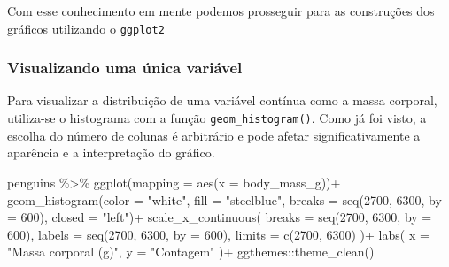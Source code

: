 \documentclass[
  12pt,
  letterpaper,
  DIV=11,
  numbers=noendperiod]{scrreprt}
\newenvironment{Shaded}{\begin{snugshade}}{\end{snugshade}}
\newcommand{\AttributeTok}[1]{\textcolor[rgb]{0.40,0.45,0.13}{#1}}
\newcommand{\DecValTok}[1]{\textcolor[rgb]{0.68,0.00,0.00}{#1}}
\newcommand{\FunctionTok}[1]{\textcolor[rgb]{0.28,0.35,0.67}{#1}}
\newcommand{\NormalTok}[1]{\textcolor[rgb]{0.00,0.23,0.31}{#1}}
\newcommand{\SpecialCharTok}[1]{\textcolor[rgb]{0.37,0.37,0.37}{#1}}
\newcommand{\StringTok}[1]{\textcolor[rgb]{0.13,0.47,0.30}{#1}}
\theoremstyle{definition}
\theoremstyle{exemplo}
\begin{document}
Com esse conhecimento em mente podemos prosseguir para as construções
dos gráficos utilizando o \texttt{ggplot2}

\subsubsection{Visualizando uma única
variável}\label{visualizando-uma-uxfanica-variuxe1vel}

Para visualizar a distribuição de uma variável contínua como a massa
corporal, utiliza-se o histograma com a função
\texttt{geom\_histogram()}. Como já foi visto, a escolha do número de
colunas é arbitrário e pode afetar significativamente a aparência e a
interpretação do gráfico.

\begin{Shaded}
\begin{Highlighting}[]
\NormalTok{penguins }\SpecialCharTok{\%\textgreater{}\%} 
  \FunctionTok{ggplot}\NormalTok{(}\AttributeTok{mapping =} \FunctionTok{aes}\NormalTok{(}\AttributeTok{x =}\NormalTok{ body\_mass\_g))}\SpecialCharTok{+}
    \FunctionTok{geom\_histogram}\NormalTok{(}\AttributeTok{color =} \StringTok{"white"}\NormalTok{, }\AttributeTok{fill =} \StringTok{"steelblue"}\NormalTok{,}
                   \AttributeTok{breaks =} \FunctionTok{seq}\NormalTok{(}\DecValTok{2700}\NormalTok{, }\DecValTok{6300}\NormalTok{, }\AttributeTok{by =} \DecValTok{600}\NormalTok{), }
                   \AttributeTok{closed =} \StringTok{"left"}\NormalTok{)}\SpecialCharTok{+}
    \FunctionTok{scale\_x\_continuous}\NormalTok{(}
      \AttributeTok{breaks =} \FunctionTok{seq}\NormalTok{(}\DecValTok{2700}\NormalTok{, }\DecValTok{6300}\NormalTok{, }\AttributeTok{by =} \DecValTok{600}\NormalTok{),}
      \AttributeTok{labels =} \FunctionTok{seq}\NormalTok{(}\DecValTok{2700}\NormalTok{, }\DecValTok{6300}\NormalTok{, }\AttributeTok{by =} \DecValTok{600}\NormalTok{),}
      \AttributeTok{limits =} \FunctionTok{c}\NormalTok{(}\DecValTok{2700}\NormalTok{, }\DecValTok{6300}\NormalTok{)}
\NormalTok{    )}\SpecialCharTok{+}
    \FunctionTok{labs}\NormalTok{(}
      \AttributeTok{x =} \StringTok{"Massa corporal (g)"}\NormalTok{,}
      \AttributeTok{y =} \StringTok{"Contagem"}
\NormalTok{    )}\SpecialCharTok{+}
\NormalTok{    ggthemes}\SpecialCharTok{::}\FunctionTok{theme\_clean}\NormalTok{()}
\end{Highlighting}
\end{Shaded}
\end{document}
